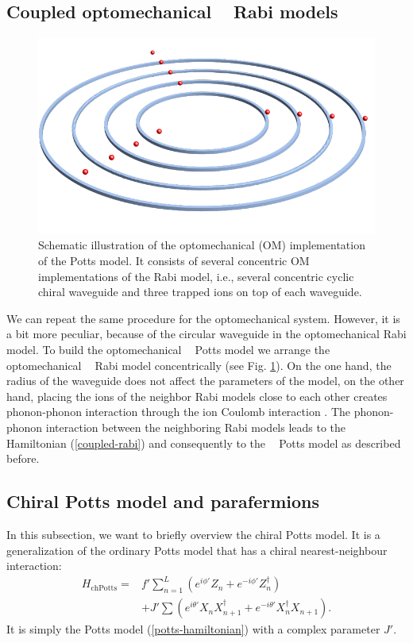 \documentclass[reprint, aps, prx, amsmath, amssymb, longbibliography, superscriptaddress]{revtex4-2}
\DeclareMathOperator{\Zthree}{\mathbb{Z}_3}
\begin{document}
\subsection{Coupled optomechanical \texorpdfstring{$\Zthree$}{Z3} Rabi models}

\begin{figure}[t]
    \centering
    \includegraphics[width = 0.8 \linewidth]{pics/optomechanical_Potts_pic.pdf}
    \caption{Schematic illustration of the optomechanical (OM) implementation of the Potts model. It consists of several concentric OM implementations of the Rabi model, i.e., several concentric cyclic chiral waveguide and three trapped ions on top of each waveguide.}
    \label{fig:optomechanical-potts}
\end{figure}

We can repeat the same procedure for the optomechanical system. However, it is a bit more peculiar, because of the circular waveguide in the optomechanical Rabi model. To build the optomechanical $\Zthree$ Potts model we arrange the optomechanical $\Zthree$ Rabi model concentrically (see Fig. \ref{fig:optomechanical-potts}). On the one hand, the radius of the waveguide does not affect the parameters of the model, on the other hand, placing the ions of the neighbor Rabi models close to each other creates phonon-phonon interaction through the ion Coulomb interaction \cite{schneider_experimental_2012,timm_dynamics_2023}. The phonon-phonon interaction between the neighboring Rabi models leads to the Hamiltonian (\ref{coupled-rabi}) and consequently to the $\Zthree$ Potts model as described before.


\subsection{Chiral Potts model and parafermions}


In this subsection, we want to briefly overview the chiral Potts model. It is a generalization of the ordinary Potts model that has a chiral nearest-neighbour interaction:
\begin{equation}
\label{chiral-potts-hamiltonian}
\begin{aligned}
    H_{\text{chPotts}} = &f'\sum_{n=1}^L (e^{i\phi'} Z_n + e^{-i\phi'} Z_n^{\dagger}) \\
    &+ J' \sum (e^{i\theta'} X_n X_{n+1}^{\dagger} + e^{-i\theta'} X_n^{\dagger} X_{n+1}).
\end{aligned}
\end{equation}
It is simply the Potts model (\ref{potts-hamiltonian}) with a complex parameter $J'$. 
\end{document}
